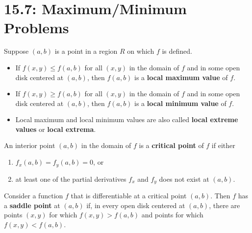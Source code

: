\documentclass[mathNotesPreamble]{subfiles}
\begin{document}
\section{15.7: Maximum/Minimum Problems}

  \begin{defn*}
    Suppose $(a,b)$ is a point in a region $R$ on which $f$ is defined. 
    \begin{itemize}
      \item 
        If $f(x,y)\leq f(a,b)$ for all $(x,y)$ in the domain of $f$ and in some open disk centered at $(a,b)$, then $f(a,b)$ is a \textbf{local maximum value} of $f$.
      \item 
        If $f(x,y)\geq f(a,b)$ for all $(x,y)$ in the domain of $f$ and in some open disk centered at $(a,b)$, then $f(a,b)$ is a \textbf{local minimum value} of $f$.
      \item 
        Local maximum and local minimum values are also called \textbf{local extreme values} or \textbf{local extrema}.
    \end{itemize}
  \end{defn*}

  \noindent

  \begin{defn*}
    An interior point $(a,b)$ in the domain of $f$ is a \textbf{critical point} of $f$ if either
    \begin{enumerate}
      \item 
        $f_x(a,b)=f_y(a,b)=0$, or
      \item 
        at least one of the partial derivatives $f_x$ and $f_y$ does not exist at $(a,b)$.
    \end{enumerate}
  \end{defn*}

  \begin{defn*}
    Consider a function $f$ that is differentiable at a critical point $(a,b)$. Then $f$ has a \textbf{saddle point} at $(a,b)$ if, in every open disk centered at $(a,b)$, there are points $(x,y)$ for which $f(x,y)>f(a,b)$ and points for which $f(x,y)<f(a,b)$.
  \end{defn*}
\end{document}
